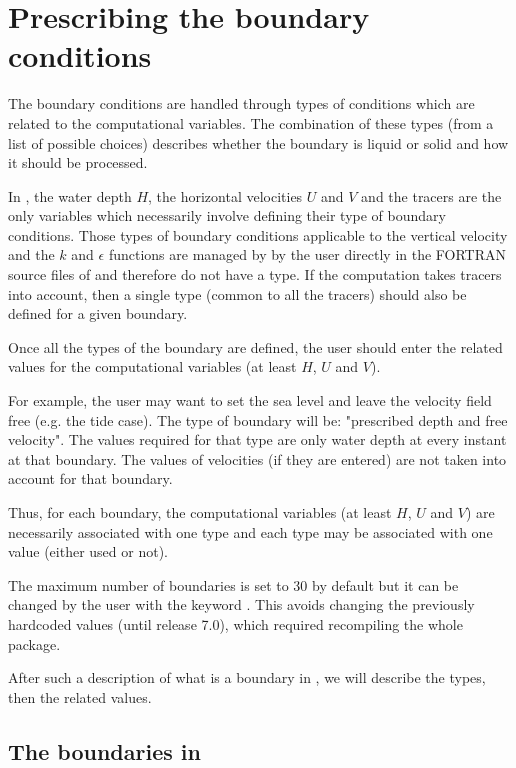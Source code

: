 \section{Prescribing the boundary conditions}
\label{sec:prescr_BC}

The boundary conditions are handled through types of conditions which are
related to the computational variables. The combination of these types (from a
list of possible choices) describes whether the boundary is liquid or solid and
how it should be processed.

In , the water depth $H$, the horizontal velocities $U$
and $V$ and the tracers are the only variables which necessarily involve
defining their type of boundary conditions. Those types of boundary conditions
applicable to the vertical velocity and the $k$ and $\epsilon$ functions
are managed by  by the user directly in the FORTRAN source files of
 and therefore do not have a type. If the computation takes tracers
into account, then a single type (common to all the tracers) should also be
defined for a given boundary.

Once all the types of the boundary are defined, the user should enter the
related values for the computational variables (at least $H$, $U$ and $V$).

For example, the user may want to set the sea level and leave the velocity
field free (e.g. the tide case). The type of boundary will be: "prescribed
depth and free velocity". The values required for that type are only water
depth at every instant at that boundary. The values of velocities (if they are
entered) are not taken into account for that boundary.

Thus, for each  boundary, the computational variables (at least
$H$, $U$ and $V$) are necessarily associated with one type
and each type may be associated with one value (either used or not).

The maximum number of boundaries is set to 30 by default but it can be changed
by the user with the keyword .
This avoids changing the previously hardcoded values (until release 7.0),
which required recompiling the whole package.

After such a description of what is a boundary in , we will describe
the types, then the related values.

\subsection{The boundaries in }

